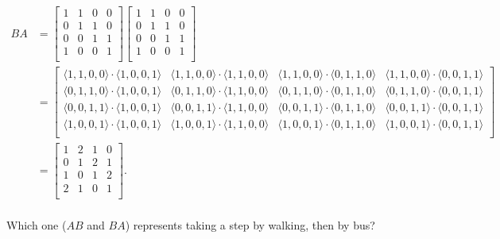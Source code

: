 \documentclass[../key.tex]{subfiles}
\begin{document}
\begin{align*}
BA &= \begin{bmatrix}
1 & 1 & 0 & 0 \\
0 & 1 & 1 & 0 \\
0 & 0 & 1 & 1 \\
1 & 0 & 0 & 1 \\
\end{bmatrix}\begin{bmatrix}
1 & 1 & 0 & 0 \\
0 & 1 & 1 & 0 \\
0 & 0 & 1 & 1 \\
1 & 0 & 0 & 1 \\
\end{bmatrix} \\
&= \begin{bmatrix}
\langle1,1,0,0\rangle\cdot \langle 1,0,0,1\rangle & \langle1,1,0,0\rangle\cdot \langle 1,1,0,0\rangle & \langle1,1,0,0\rangle\cdot \langle 0,1,1,0\rangle & \langle1,1,0,0\rangle\cdot \langle 0,0,1,1\rangle \\
\langle0,1,1,0\rangle\cdot \langle 1,0,0,1\rangle & \langle0,1,1,0\rangle\cdot \langle 1,1,0,0\rangle & \langle0,1,1,0\rangle\cdot \langle 0,1,1,0\rangle & \langle0,1,1,0\rangle\cdot \langle 0,0,1,1\rangle \\
\langle0,0,1,1\rangle\cdot \langle 1,0,0,1\rangle & \langle0,0,1,1\rangle\cdot \langle 1,1,0,0\rangle & \langle0,0,1,1\rangle\cdot \langle 0,1,1,0\rangle & \langle0,0,1,1\rangle\cdot \langle 0,0,1,1\rangle \\
\langle1,0,0,1\rangle\cdot \langle 1,0,0,1\rangle & \langle1,0,0,1\rangle\cdot \langle 1,1,0,0\rangle & \langle1,0,0,1\rangle\cdot \langle 0,1,1,0\rangle & \langle1,0,0,1\rangle\cdot \langle 0,0,1,1\rangle \\
\end{bmatrix} \\
&= \begin{bmatrix}
1 & 2 & 1 & 0 \\
0 & 1 & 2 & 1 \\
1 & 0 & 1 & 2 \\
2 & 1 & 0 & 1 \\
\end{bmatrix}. \\
\end{align*}

\begin{inner_problem}
\item Which one ($AB$ and $BA$) represents taking a step by walking, then by bus?
\end{inner_problem}
\end{document}
